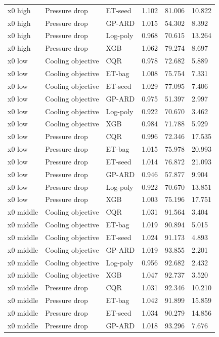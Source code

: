 \begin{longtable}{llllll}
x0 high & Pressure drop & ET-seed & 1.102 & 81.006 & 10.822\\
x0 high & Pressure drop & GP-ARD & 1.015 & 54.302 & 8.392\\
x0 high & Pressure drop & Log-poly & 0.968 & 70.615 & 13.264\\
x0 high & Pressure drop & XGB & 1.062 & 79.274 & 8.697\\
x0 low & Cooling objective & CQR & 0.978 & 72.682 & 5.889\\
x0 low & Cooling objective & ET-bag & 1.008 & 75.754 & 7.331\\
x0 low & Cooling objective & ET-seed & 1.029 & 77.095 & 7.406\\
x0 low & Cooling objective & GP-ARD & 0.975 & 51.397 & 2.997\\
x0 low & Cooling objective & Log-poly & 0.922 & 70.670 & 3.462\\
x0 low & Cooling objective & XGB & 0.984 & 71.788 & 5.929\\
x0 low & Pressure drop & CQR & 0.996 & 72.346 & 17.535\\
x0 low & Pressure drop & ET-bag & 1.015 & 75.978 & 20.993\\
x0 low & Pressure drop & ET-seed & 1.014 & 76.872 & 21.093\\
x0 low & Pressure drop & GP-ARD & 0.946 & 57.877 & 9.904\\
x0 low & Pressure drop & Log-poly & 0.922 & 70.670 & 13.851\\
x0 low & Pressure drop & XGB & 1.003 & 75.196 & 17.751\\
x0 middle & Cooling objective & CQR & 1.031 & 91.564 & 3.404\\
x0 middle & Cooling objective & ET-bag & 1.019 & 90.894 & 5.015\\
x0 middle & Cooling objective & ET-seed & 1.024 & 91.173 & 4.893\\
x0 middle & Cooling objective & GP-ARD & 1.019 & 93.855 & 2.201\\
x0 middle & Cooling objective & Log-poly & 0.956 & 92.682 & 2.432\\
x0 middle & Cooling objective & XGB & 1.047 & 92.737 & 3.520\\
x0 middle & Pressure drop & CQR & 1.031 & 92.346 & 10.210\\
x0 middle & Pressure drop & ET-bag & 1.042 & 91.899 & 15.859\\
x0 middle & Pressure drop & ET-seed & 1.034 & 90.279 & 14.856\\
x0 middle & Pressure drop & GP-ARD & 1.018 & 93.296 & 7.676\\

\end{longtable}
